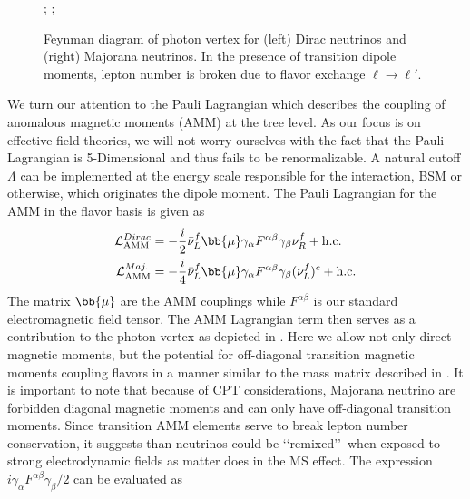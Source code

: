 \begin{figure}
	;
	;
	\caption{Feynman diagram of photon vertex for (left) Dirac neutrinos and (right) Majorana neutrinos. In the presence of transition dipole moments, lepton number is broken due to flavor exchange $\ell\rightarrow\ell'$.}\label{mass:fig:01}
\end{figure}

We turn our attention to the Pauli Lagrangian which describes the coupling of anomalous magnetic moments (AMM) at the tree level. As our focus is on effective field theories, we will not worry ourselves with the fact that the Pauli Lagrangian is 5-Dimensional and thus fails to be renormalizable. A natural cutoff $\Lambda$ can be implemented at the energy scale responsible for the interaction, BSM or otherwise, which originates the dipole moment. The Pauli Lagrangian for the AMM in the flavor basis is given as
\begin{alignat}{1}
	\label{mass:eq:04a} \mathcal{L}_{\mathrm{AMM}}^{Dirac} &= -\frac{i}{2}\bar{\nu}^{f}_{L}\bb{\mu}\gamma_{\alpha}F^{\alpha\beta}\gamma_{\beta}\nu^{f}_{R}+\mathrm{h.c.}\\
	\label{mass:eq:0b} \mathcal{L}_{\mathrm{AMM}}^{Maj.} &= -\frac{i}{4}\bar{\nu}^{f}_{L}\bb{\mu}\gamma_{\alpha}F^{\alpha\beta}\gamma_{\beta}(\nu^{f}_{L})^{c}+\mathrm{h.c.}
\end{alignat}
The matrix $\bb{\mu}$ are the AMM couplings while $F^{\alpha\beta}$ is our standard electromagnetic field tensor. The AMM Lagrangian term then serves as a contribution to the photon vertex as depicted in . Here we allow not only direct magnetic moments, but the potential for off-diagonal transition magnetic moments coupling flavors in a manner similar to the mass matrix described in . It is important to note that because of CPT considerations, Majorana neutrino are forbidden diagonal magnetic moments and can only have off-diagonal transition moments. Since transition AMM elements serve to break lepton number conservation, it suggests than neutrinos could be \lq\lq remixed\rq\rq\ when exposed to strong electrodynamic fields as matter does in the MS effect. The expression $i\gamma_{\alpha}F^{\alpha\beta}\gamma_{\beta}/2$ can be evaluated as
